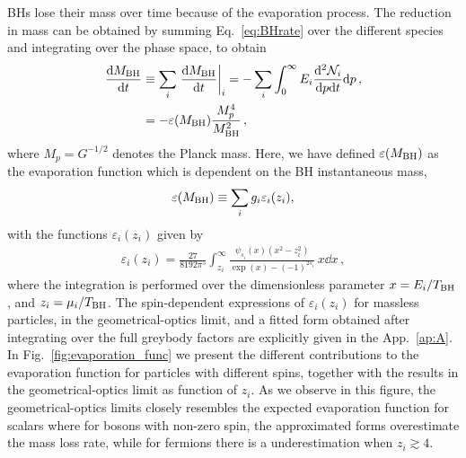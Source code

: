 \documentclass[aps,prd,reprint,twocolumn,preprintnumbers,floatfix,nofootinbib]{revtex4-1}
\newcommand{\TBH}{T_{\rm BH}}
\newcommand{\MBH}{M_{\rm BH}}
\newcommand{\MPL}{M_p}
\begin{document}
BHs lose their mass over time because of the evaporation process.  The reduction in mass can be obtained by summing Eq.~\eqref{eq:BHrate} over the different species and integrating over the phase space, to obtain \cite{PhysRevD.41.3052,PhysRevD.44.376}
\begin{align}\label{eq:dMBHdt}
\frac{\dd \MBH}{\dd t}&\equiv \sum_i \left.\frac{
\dd \MBH}{\dd t}\right|_i = -\sum_i \int_0^\infty E_i \frac{\dd^2 \mathcal{N}_{i}}{\dd p\dd t} \dd p\,,\nonumber\\ 
&=-\varepsilon(\MBH)\frac{\MPL^4}{\MBH^2}\,,
\end{align}
where $M_p=G^{-1/2}$ denotes the Planck mass. Here, we have defined $\varepsilon(\MBH)$ as the evaporation function  which is dependent on the BH instantaneous mass,
\begin{align}
    \varepsilon(\MBH) \equiv \sum_i g_i\varepsilon_i(z_i),
\end{align}
with the functions $\varepsilon_i(z_i)$ given by
\begin{align}
   \varepsilon_i(z_i) = \frac{27}{8192\pi^5}\int_{z_i}^\infty\frac{\psi_{s_i}(x)(x^2-z_i^2)}{\exp(x)-(-1)^{2s_i}}\,x\dd{x}\,,
\end{align}
where the integration is performed over the dimensionless parameter $x=E_i/\TBH$, and $z_i=\mu_i/\TBH$. The spin-dependent expressions of $\varepsilon_i (z_i)$ for massless particles, in the geometrical-optics limit, and a fitted form obtained after integrating over the full greybody factors are explicitly given in the App.~\ref{ap:A}. In Fig.~\ref{fig:evaporation_func} we present the different contributions to the evaporation function for particles with different spins, together with the results in the geometrical-optics limit as function of $z_i$. As we  observe in this figure, the geometrical-optics limits closely resembles the expected evaporation function for scalars where for bosons with non-zero spin, the approximated forms overestimate the mass loss rate, while for fermions there is a underestimation when $z_i\gtrsim 4$.
\end{document}
